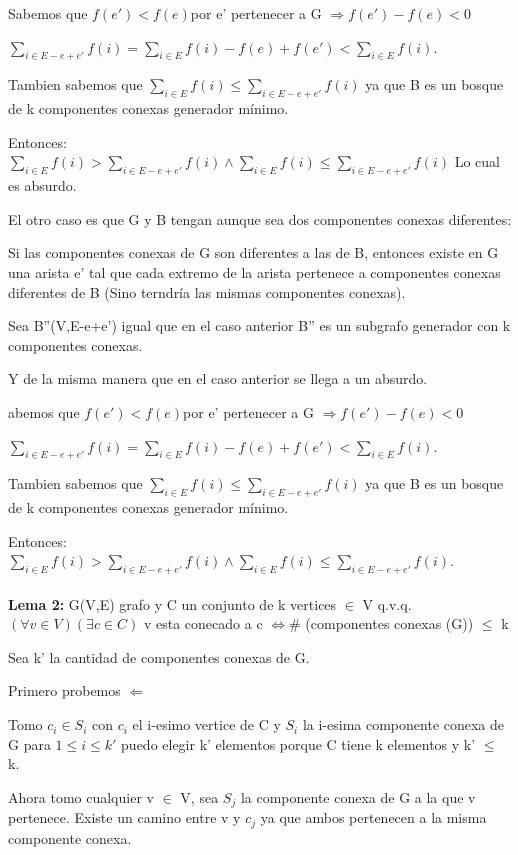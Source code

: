 Sabemos que $f(e') < f(e) $por e' pertenecer a G $\Rightarrow f(e') - f(e) < 0$

$\sum_{i \in E-e+e'} f(i) = \sum_{i \in E} f(i) - f(e) + f(e') < \sum_{i \in E} f(i)$.

Tambien sabemos que $\sum_{i \in E} f(i) \leq \sum_{i \in E-e+e'} f(i)$ ya que B es un bosque de k componentes conexas generador mínimo.

Entonces: $\sum_{i \in E} f(i) > \sum_{i \in E-e+e'} f(i) \wedge \sum_{i \in E} f(i) \leq \sum_{i \in E-e+e'} f(i)$
Lo cual es absurdo.

El otro caso es que G y B tengan aunque sea dos componentes conexas diferentes:

Si las componentes conexas de G son diferentes a las de B, entonces existe en G una arista e' tal que cada extremo de la arista pertenece a componentes conexas diferentes de B (Sino terndría las mismas componentes conexas).

Sea B''(V,E-e+e') igual que en el caso anterior B'' es un subgrafo generador con k componentes conexas.

Y de la misma manera que en el caso anterior se llega a un absurdo.

abemos que $f(e') < f(e) $por e' pertenecer a G $\Rightarrow f(e') - f(e) < 0$

$\sum_{i \in E-e+e'} f(i) = \sum_{i \in E} f(i) - f(e) + f(e') < \sum_{i \in E} f(i)$.

Tambien sabemos que $\sum_{i \in E} f(i) \leq \sum_{i \in E-e+e'} f(i)$ ya que B es un bosque de k componentes conexas generador mínimo.

Entonces: $\sum_{i \in E} f(i) > \sum_{i \in E-e+e'} f(i) \wedge \sum_{i \in E} f(i) \leq \sum_{i \in E-e+e'} f(i)$. \\ \\


\textbf{Lema 2:} G(V,E) grafo y C un conjunto de k vertices $\in $ V q.v.q. $(\forall v \in V)(\exists c \in C)$ v esta conecado a c $\Leftrightarrow \#$ (componentes conexas (G)) $\leq$ k

Sea k' la cantidad de componentes conexas de G.

Primero probemos $\Leftarrow$

Tomo $c_i \in S_i$ con $c_i$ el i-esimo vertice de C y $S_i$ la i-esima componente conexa de G para $1 \leq i \leq k'$ puedo elegir k' elementos porque C tiene k elementos y k' $\leq$ k.

Ahora tomo cualquier v $\in$ V, sea $S_j$ la componente conexa de G a la que v pertenece. Existe un camino entre v y $c_j$ ya que ambos pertenecen a la misma componente conexa.

